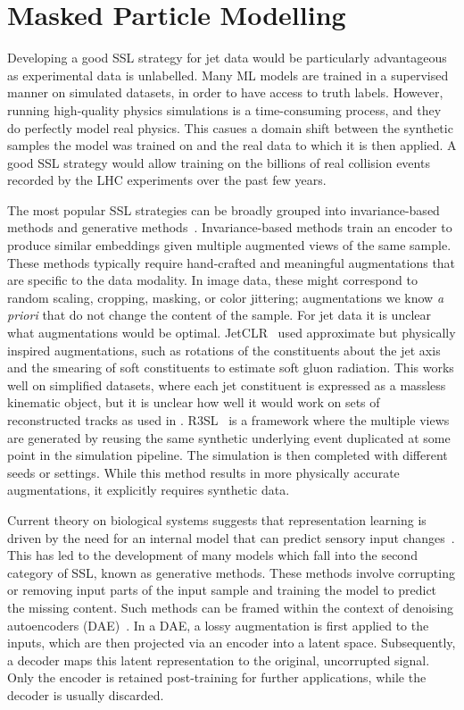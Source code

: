 \section{Masked Particle Modelling}

Developing a good SSL strategy for jet data would be particularly advantageous as experimental data is unlabelled.
Many ML models are trained in a supervised manner on simulated datasets, in order to have access to truth labels.
However, running high-quality physics simulations is a time-consuming process, and they do perfectly model real physics.
This casues a domain shift between the synthetic samples the model was trained on and the real data to which it is then applied.
A good SSL strategy would allow training on the billions of real collision events recorded by the LHC experiments over the past few years.

The most popular SSL strategies can be broadly grouped into invariance-based methods and generative methods~\cite{IJepa}.
Invariance-based methods train an encoder to produce similar embeddings given multiple augmented views of the same sample.
These methods typically require hand-crafted and meaningful augmentations that are specific to the data modality.
In image data, these might correspond to random scaling, cropping, masking, or color jittering; augmentations we know \textit{a priori} that do not change the content of the sample.
For jet data it is unclear what augmentations would be optimal.
JetCLR~\cite{JetCLR} used approximate but physically inspired augmentations, such as rotations of the constituents about the jet axis and the smearing of soft constituents to estimate soft gluon radiation.
This works well on simplified datasets, where each jet constituent is expressed as a massless kinematic object, but it is unclear how well it would work on sets of reconstructed tracks as used in .
R3SL~\cite{ReSim} is a framework where the multiple views are generated by reusing the same synthetic underlying event duplicated at some point in the simulation pipeline.
The simulation is then completed with different seeds or settings.
While this method results in more physically accurate augmentations, it explicitly requires synthetic data.

Current theory on biological systems suggests that representation learning is driven by the need for an internal model that can predict sensory input changes~\cite{cognitivelearning}.
This has led to the development of many models which fall into the second category of SSL, known as generative methods.
These methods involve corrupting or removing input parts of the input sample and training the model to predict the missing content.
Such methods can be framed within the context of denoising autoencoders (DAE)~\cite{DAE}.
In a DAE, a lossy augmentation is first applied to the inputs, which are then projected via an encoder into a latent space.
Subsequently, a decoder maps this latent representation to the original, uncorrupted signal.
Only the encoder is retained post-training for further applications, while the decoder is usually discarded.

